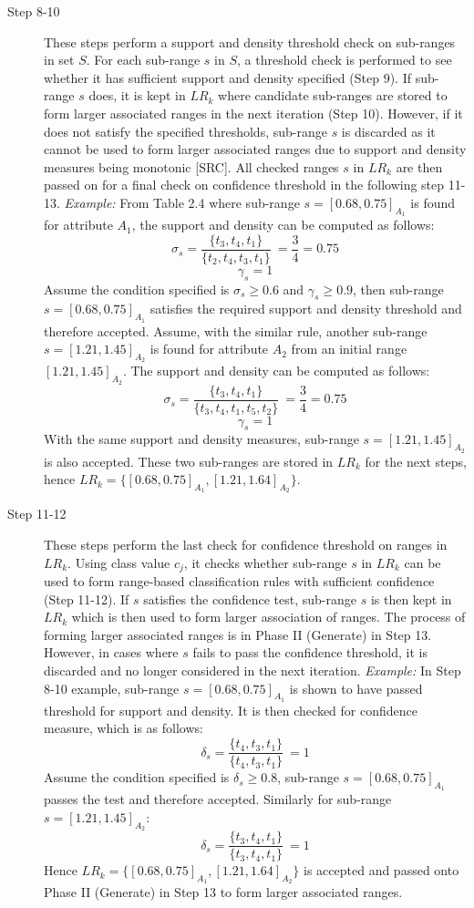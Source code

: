 \begin{description}
\item[Step 8-10] These steps perform a support and density threshold check on sub-ranges in set $S$. For each sub-range $s$ in $S$, a threshold check is performed to see whether it has sufficient support and density specified (Step 9). If sub-range $s$ does, it is kept in $LR_k$ where candidate sub-ranges are stored to form larger associated ranges in the next iteration (Step 10). However, if it does not satisfy the specified thresholds, sub-range $s$ is discarded as it cannot be used to form larger associated ranges due to support and density measures being monotonic [SRC]. All checked ranges $s$ in $LR_k$ are then passed on for a final check on confidence threshold in the following step 11-13. 
\textit{Example: } From Table 2.4 where sub-range $s = [0.68,0.75]_{A_1}$ is found for attribute $A_1$, the support and density can be computed as follows:
\[ \sigma_s = \frac{\{t_3,t_4,t_1\}}{\{t_2,t_4,t_3,t_1\}}\ = \frac{3}{4} = 0.75 \] 
\[ \gamma_s = 1 \] 
Assume the condition specified is $\sigma_s \geq 0.6$ and $\gamma_s \geq 0.9$, then sub-range $s = [0.68,0.75]_{A_1}$ satisfies the required support and density threshold and therefore accepted.  
Assume, with the similar rule, another sub-range $s = [1.21, 1.45]_{A_2}$ is found for attribute $A_2$ from an initial range $[1.21, 1.45]_{A_2}$. The support and density can be computed as follows:
\[ \sigma_s = \frac{\{t_3,t_4,t_1\}}{\{t_3,t_4,t_1,t_5,t_2\}}\ = \frac{3}{4} = 0.75 \] 
\[ \gamma_s = 1 \] 
With the same support and density measures, sub-range  $s = [1.21, 1.45]_{A_2}$ is also accepted.
These two sub-ranges are stored in $LR_k$ for the next steps, hence $LR_k = \{[0.68, 0.75]_{A_1}, [1.21,1.64]_{A_2}\}$. \\

\item[Step 11-12] These steps perform the last check for confidence threshold on ranges in $LR_k$. Using class value $c_j$, it checks whether sub-range $s$ in $LR_k$ can be used to form range-based classification rules with sufficient confidence (Step 11-12). If $s$ satisfies the confidence test, sub-range $s$ is then kept in $LR_k$ which is then used to form larger association of ranges. The process of forming larger associated ranges is in Phase II (Generate) in Step 13. However, in cases where $s$ fails to pass the confidence threshold, it is discarded and no longer considered in the next iteration.
\textit{Example: } In Step 8-10 example, sub-range $s = [0.68,0.75]_{A_1}$ is shown to have passed threshold for support and density. It is then checked for confidence measure, which is as follows:
\[ \delta_s = \frac{\{t_4,t_3,t_1\}}{\{t_4,t_3,t_1\}}\ = 1 \] 
Assume the condition specified is $\delta_s \geq 0.8$, sub-range $s = [0.68,0.75]_{A_1}$ passes the test and therefore accepted.
Similarly for sub-range $s = [1.21, 1.45]_{A_2}$:
\[ \delta_s = \frac{\{t_3,t_4,t_1\}}{\{t_3,t_4,t_1\}}\ = 1 \] 
Hence $LR_k = \{[0.68, 0.75]_{A_1}, [1.21,1.64]_{A_2}\}$ is accepted and passed onto Phase II (Generate) in Step 13 to form larger associated ranges.


\end{description}
